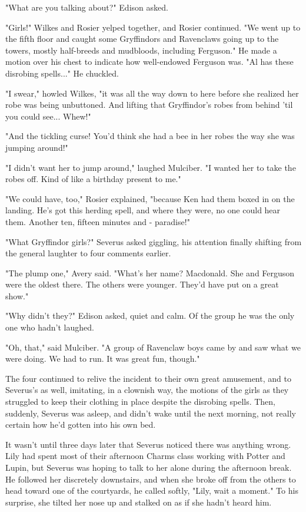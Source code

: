 \documentclass[a4paper,11pt]{article}
\begin{document}
"What are you talking about?" Edison asked.

"Girls!" Wilkes and Rosier yelped together, and Rosier continued. "We went up to the fifth floor and caught some Gryffindors and Ravenclaws going up to the towers, mostly half-breeds and mudbloods, including Ferguson." He made a motion over his chest to indicate how well-endowed Ferguson was. "Al has these disrobing spells..." He chuckled.

"I swear," howled Wilkes, "it was all the way down to here before she realized her robe was being unbuttoned. And lifting that Gryffindor's robes from behind 'til you could see... Whew!"

"And the tickling curse! You'd think she had a bee in her robes the way she was jumping around!"

"I didn't want her to jump around," laughed Mulciber. "I wanted her to take the robes off. Kind of like a birthday present to me."

"We could have, too," Rosier explained, "because Ken had them boxed in on the landing. He's got this herding spell, and where they were, no one could hear them. Another ten, fifteen minutes and - paradise!"

"What Gryffindor girls?" Severus asked giggling, his attention finally shifting from the general laughter to four comments earlier.

"The plump one," Avery said. "What's her name? Macdonald. She and Ferguson were the oldest there. The others were younger. They'd have put on a great show."

"Why didn't they?" Edison asked, quiet and calm. Of the group he was the only one who hadn't laughed.

"Oh, that," said Mulciber. "A group of Ravenclaw boys came by and saw what we were doing. We had to run. It was great fun, though."

The four continued to relive the incident to their own great amusement, and to Severus's as well, imitating, in a clownish way, the motions of the girls as they struggled to keep their clothing in place despite the disrobing spells. Then, suddenly, Severus was asleep, and didn't wake until the next morning, not really certain how he'd gotten into his own bed.

It wasn't until three days later that Severus noticed there was anything wrong. Lily had spent most of their afternoon Charms class working with Potter and Lupin, but Severus was hoping to talk to her alone during the afternoon break. He followed her discretely downstairs, and when she broke off from the others to head toward one of the courtyards, he called softly, "Lily, wait a moment." To his surprise, she tilted her nose up and stalked on as if she hadn't heard him.
\end{document}
